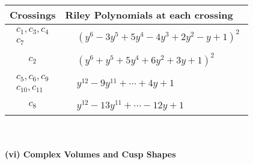 \documentclass[1p]{elsarticle_modified}
\theoremstyle{definition}
\begin{document}
\begin{tabular}{m{50pt}|m{274pt}}
Crossings & \hspace{64pt}Riley Polynomials at each crossing \\
\hline $$\begin{aligned}c_{1},c_{3},c_{4}\\c_{7}\end{aligned}$$&$\begin{aligned}
&(y^6-3 y^5+5 y^4-4 y^3+2 y^2- y+1)^2
\end{aligned}$\\
\hline $$\begin{aligned}c_{2}\end{aligned}$$&$\begin{aligned}
&(y^6+y^5+5 y^4+6 y^2+3 y+1)^2
\end{aligned}$\\
\hline $$\begin{aligned}c_{5},c_{6},c_{9}\\c_{10},c_{11}\end{aligned}$$&$\begin{aligned}
&y^{12}-9 y^{11}+\cdots+4 y+1
\end{aligned}$\\
\hline $$\begin{aligned}c_{8}\end{aligned}$$&$\begin{aligned}
&y^{12}-13 y^{11}+\cdots-12 y+1
\end{aligned}$\\
\hline
\end{tabular}\\~\\
\newpage\flushleft \textbf{(vi) Complex Volumes and Cusp Shapes}
\end{document}
